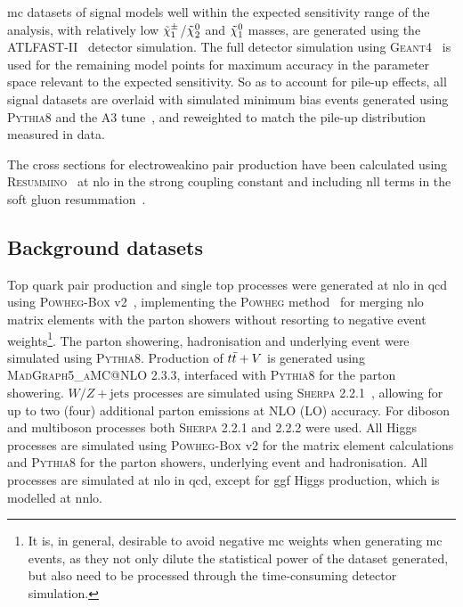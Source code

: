 \gls{mc} datasets of signal models well within the expected sensitivity range of the analysis, \ie with relatively low $\tilde{\chi}_1^\pm$/$\tilde{\chi}_2^0$ and $\tilde{\chi}_1^0$ masses, are generated using the \textsc{ATLFAST-II}~\cite{Aad:2010ah} detector simulation. The full detector simulation using \textsc{Geant4}~\cite{geant:2002hh} is used for the remaining model points for maximum accuracy in the parameter space relevant to the expected sensitivity. So as to account for pile-up effects, all signal datasets are overlaid with simulated minimum bias events generated using \textsc{Pythia8} and the A3 tune~\cite{ATL-PHYS-PUB-2016-017}, and reweighted to match the pile-up distribution measured in data. 

The cross sections for electroweakino pair production have been calculated using \mbox{\textsc{Resummino}}~\cite{Fuks:2013vua} at \gls{nlo} in the strong coupling constant and including \gls{nll} terms in the soft gluon resummation~\cite{Fiaschi:2018hgm,Fuks:2012qx}.

\subsection{Background datasets}

Top quark pair production and single top processes were generated at \gls{nlo} in \gls{qcd} using \textsc{Powheg-Box} v2~\cite{PowhegBox:2010xd}, implementing the \textsc{Powheg} method~\cite{Powheg1,Powheg2} for merging \gls{nlo} matrix elements with the parton showers without resorting to negative event weights\footnote{It is, in general, desirable to avoid negative \gls{mc} weights when generating \gls{mc} events, as they not only dilute the statistical power of the dataset generated, but also need to be processed through the time-consuming detector simulation.}.
The parton showering, hadronisation and underlying event were simulated using \textsc{Pythia8}. Production of $t\bar{t}+V$ is generated using \textsc{MadGraph5\_aMC@NLO} 2.3.3, interfaced with \textsc{Pythia8} for the parton showering. 
$W/Z+\mathrm{jets}$ processes are simulated using \textsc{Sherpa} 2.2.1~\cite{Gleisberg:2008ta,Bothmann:2019yzt}, allowing for up to two (four) additional parton emissions at NLO (LO) accuracy. 
For diboson and multiboson  processes both \textsc{Sherpa} 2.2.1 and 2.2.2 were used. 
All Higgs processes are simulated using \textsc{Powheg-Box} v2 for the matrix element calculations and \textsc{Pythia8} for the parton showers, underlying event and hadronisation. All processes are simulated at \gls{nlo} in \gls{qcd}, except for \gls{ggf} Higgs production, which is modelled at \gls{nnlo}.

